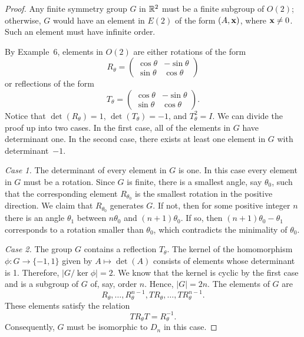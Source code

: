  
\begin{proof}
Any finite symmetry group $G$ in ${\Bbb R}^2$ must be a finite
subgroup of $O(2)$; otherwise, $G$ would have an element in $E(2)$ of
the form $(A, {\bold x})$, where ${\bold x} \neq 0$.  Such an element
must have infinite order. 
 
 
By Example~6, elements in $O(2)$ are either rotations of the form
\[
R_{\theta}
=
\left(
\begin{array}{cc}
\cos \theta & - \sin \theta \\
\sin \theta & \cos \theta
\end{array}
\right)
\]
or reflections of the form
\[T_{\theta}
=
\left(
\begin{array}{cc}
\cos \theta & - \sin \theta \\
\sin \theta & \cos \theta
\end{array}
\right).
\]
Notice that $\det(R_{\theta})=1$,  $\det(T_{\theta})=-1$,
and $T_{\theta}^2=I$. We can divide the proof up into two cases.  In
the first case, all of the elements in $G$ have determinant one. In the
second case, there exists at least one element in $G$ with 
determinant~$-1$.  
 
 
{\em Case 1.}  
The determinant of every element in $G$ is one. In this case every
element in $G$ must be a rotation. Since $G$ is finite, there is a
smallest angle, say $\theta_0$, such that the corresponding element
$R_{\theta_0}$ is the smallest rotation in the positive direction.  We
claim that $R_{\theta_0}$ generates $G$.  If not, then for some
positive integer $n$ there is an angle $\theta_1$ between $n \theta_0$
and $(n+1) \theta_0$. If so, then $(n+1) \theta_0 - \theta_1$
corresponds to a rotation smaller than $\theta_0$, which contradicts
the minimality of $\theta_0$.   
 
 
 
{\em Case 2.}  
The group $G$ contains a reflection $T_{\theta}$.  The kernel of the
homomorphism $\phi : G \rightarrow \{-1, 1\}$ given by $A \mapsto
\det(A)$ consists of elements whose determinant is 1.  Therefore, $|G/
\ker \phi|=2$.  We know that the kernel is cyclic by the first case
and is a subgroup of $G$ of, say, order $n$. Hence, $|G| = 2n$. The
elements of $G$ are
\[
R_{\theta}, \ldots, R_{\theta}^{n-1},  TR_{\theta}, \ldots,
TR_{\theta}^{n-1}.
\]
These elements satisfy the relation
\[
TR_{\theta}T = R_{\theta}^{-1}.
\]
Consequently, $G$ must be isomorphic to $D_n$ in this case.
\end{proof}
 
 
 
